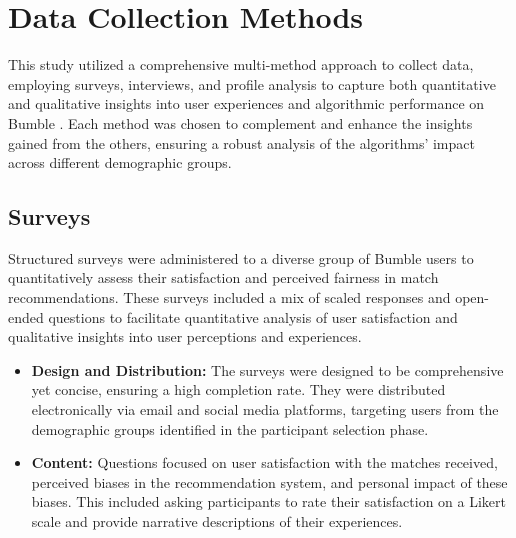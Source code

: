 \section{Data Collection Methods}
This study utilized a comprehensive multi-method approach to collect data, employing surveys, interviews, and profile analysis to capture both quantitative and qualitative insights into user experiences and algorithmic performance on Bumble \cite{Kalra_Gupta_Varghese_Rangaswamy_2023}. Each method was chosen to complement and enhance the insights gained from the others, ensuring a robust analysis of the algorithms’ impact across different demographic groups.

\subsection{Surveys}
Structured surveys were administered to a diverse group of Bumble users to quantitatively assess their satisfaction and perceived fairness in match recommendations. These surveys included a mix of scaled responses and open-ended questions to facilitate quantitative analysis of user satisfaction and qualitative insights into user perceptions and experiences.

\begin{itemize}
    \item \textbf{Design and Distribution:} The surveys were designed to be comprehensive yet concise, ensuring a high completion rate. They were distributed electronically via email and social media platforms, targeting users from the demographic groups identified in the participant selection phase. 
    \item \textbf{Content:}  Questions focused on user satisfaction with the matches received, perceived biases in the recommendation system, and personal impact of these biases. This included asking participants to rate their satisfaction on a Likert scale and provide narrative descriptions of their experiences.
\end{itemize}


